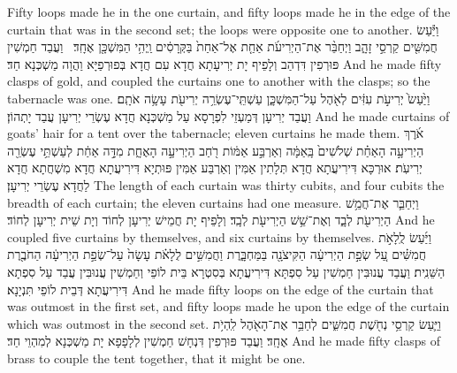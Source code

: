 {Fifty loops made he in the one curtain, and fifty loops made he in the edge of the curtain that was in the second set; the loops were opposite one to another.}{}
{וַיַּ֕עַשׂ חֲמִשִּׁ֖ים קַרְסֵ֣י זָהָ֑ב וַיְחַבֵּ֨ר אֶת־הַיְרִיעֹ֜ת אַחַ֤ת אֶל־אַחַת֙ בַּקְּרָסִ֔ים וַֽיְהִ֥י הַמִּשְׁכָּ֖ן אֶחָֽד׃ \petucha }
{וַעֲבַד חַמְשִׁין פּוּרְפִין דִּדְהַב וְלָפֵיף יָת יְרִיעָתָא חֲדָא עִם חֲדָא בְּפוּרְפַיָּא וַהֲוָה מַשְׁכְּנָא חַד׃}
{And he made fifty clasps of gold, and coupled the curtains one to another with the clasps; so the tabernacle was one.}{}
{וַיַּ֙עַשׂ֙ יְרִיעֹ֣ת עִזִּ֔ים לְאֹ֖הֶל עַל־הַמִּשְׁכָּ֑ן עַשְׁתֵּֽי־עֶשְׂרֵ֥ה יְרִיעֹ֖ת עָשָׂ֥ה אֹתָֽם׃}
{וַעֲבַד יְרִיעָן דְּמַעְזֵי לִפְרָסָא עַל מַשְׁכְּנָא חֲדָא עֶשְׂרֵי יְרִיעָן עֲבַד יָתְהוֹן׃}
{And he made curtains of goats’ hair for a tent over the tabernacle; eleven curtains he made them.}{}
{אֹ֜רֶךְ הַיְרִיעָ֣ה הָאַחַ֗ת שְׁלֹשִׁים֙ בָּֽאַמָּ֔ה וְאַרְבַּ֣ע אַמּ֔וֹת רֹ֖חַב הַיְרִיעָ֣ה הָאֶחָ֑ת מִדָּ֣ה אַחַ֔ת לְעַשְׁתֵּ֥י עֶשְׂרֵ֖ה יְרִיעֹֽת׃}
{אוּרְכָּא דִּירִיעֲתָא חֲדָא תְּלָתִין אַמִּין וְאַרְבַּע אַמִּין פּוּתְיָא דִּירִיעֲתָא חֲדָא מִשְׁחֲתָא חֲדָא לַחֲדָא עֶשְׂרֵי יְרִיעָן׃}
{The length of each curtain was thirty cubits, and four cubits the breadth of each curtain; the eleven curtains had one measure.}{}
{וַיְחַבֵּ֛ר אֶת־חֲמֵ֥שׁ הַיְרִיעֹ֖ת לְבָ֑ד וְאֶת־שֵׁ֥שׁ הַיְרִיעֹ֖ת לְבָֽד׃}
{וְלָפֵיף יָת חֲמֵישׁ יְרִיעָן לְחוֹד וְיָת שֵׁית יְרִיעָן לְחוֹד׃}
{And he coupled five curtains by themselves, and six curtains by themselves.}{}
{וַיַּ֜עַשׂ לֻֽלָאֹ֣ת חֲמִשִּׁ֗ים עַ֚ל שְׂפַ֣ת הַיְרִיעָ֔ה הַקִּיצֹנָ֖ה בַּמַּחְבָּ֑רֶת וַחֲמִשִּׁ֣ים לֻלָאֹ֗ת עָשָׂה֙ עַל־שְׂפַ֣ת הַיְרִיעָ֔ה הַחֹבֶ֖רֶת הַשֵּׁנִֽית׃}
{וַעֲבַד עֲנוּבִּין חַמְשִׁין עַל סִפְתָּא דִּירִיעֲתָא בְּסִטְרָא בֵּית לוֹפֵי וְחַמְשִׁין עֲנוּבִּין עֲבַד עַל סִפְתָא דִּירִיעֲתָא דְּבֵית לוֹפֵי תִּנְיָנָא׃}
{And he made fifty loops on the edge of the curtain that was outmost in the first set, and fifty loops made he upon the edge of the curtain which was outmost in the second set.}{}
{וַיַּ֛עַשׂ קַרְסֵ֥י נְחֹ֖שֶׁת חֲמִשִּׁ֑ים לְחַבֵּ֥ר אֶת־הָאֹ֖הֶל לִֽהְיֹ֥ת אֶחָֽד׃}
{וַעֲבַד פּוּרְפִין דִּנְחָשׁ חַמְשִׁין לְלָפָפָא יָת מַשְׁכְּנָא לְמִהְוֵי חַד׃}
{And he made fifty clasps of brass to couple the tent together, that it might be one.}{}
